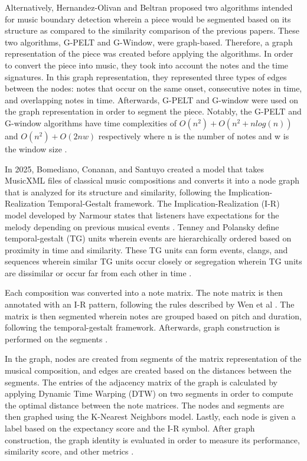 Alternatively, Hernandez-Olivan and Beltran proposed two algorithms intended for music boundary detection wherein a piece would be segmented based on its structure as compared to the similarity comparison of the previous papers. These two algorithms, G-PELT and G-Window, were graph-based. Therefore, a graph representation of the piece was created before applying the algorithms. In order to convert the piece into music, they took into account the notes and the time signatures. In this graph representation, they represented three types of edges between the nodes: notes that occur on the same onset, consecutive notes in time, and overlapping notes in time. Afterwards, G-PELT and G-window were used on the graph representation in order to segment the piece. Notably, the G-PELT and G-window algorithms have time complexities of $O(n^2) + O(n^2+nlog(n))$ and $O(n^2)+O(2nw)$ respectively where n is the number of notes and w is the window size \cite{HernandezOlivanBeltran}.

In 2025, Bomediano, Conanan, and Santuyo created a model that takes MusicXML files of classical music compositions and converts it into a node graph that is analyzed for its structure and similarity, following the Implication-Realization Temporal-Gestalt framework. The Implication-Realization (I-R) model developed by Narmour states that listeners have expectations for the melody depending on previous musical events \cite{FosterNarmour}. Tenney and Polansky define temporal-gestalt (TG) units wherein events are hierarchically ordered based on proximity in time and similarity. These TG units can form events, clangs, and sequences wherein similar TG units occur closely or segregation wherein TG units are dissimilar or occur far from each other in time \cite{TenneyPolansky}.

Each composition was converted into a note matrix. The note matrix is then annotated with an I-R pattern, following the rules described by Wen et al \cite{WenEtAl}. The matrix is then segmented wherein notes are grouped based on pitch and duration, following the temporal-gestalt framework. Afterwards, graph construction is performed on the segments \cite{ConananEtAl}.

In the graph, nodes are created from segments of the matrix representation of the musical composition, and edges are created based on the distances between the segments. The entries of the adjacency matrix of the graph is calculated by applying Dynamic Time Warping (DTW) on two segments in order to compute the optimal distance between the note matrices. The nodes and segments are then graphed using the K-Nearest Neighbors model. Lastly, each node is given a label based on the expectancy score and the I-R symbol. After graph construction, the graph identity is evaluated in order to measure its performance, similarity score, and other metrics \cite{ConananEtAl}.

